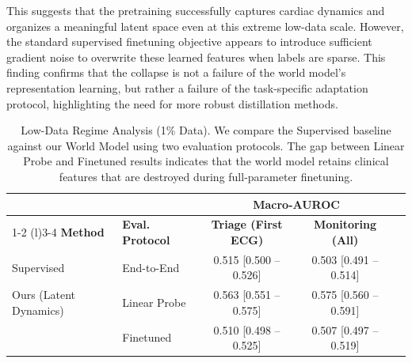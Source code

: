This suggests that the pretraining successfully captures cardiac dynamics and organizes a meaningful latent space even at this extreme low-data scale. However, the standard supervised finetuning objective appears to introduce sufficient gradient noise to overwrite these learned features when labels are sparse. This finding confirms that the collapse is not a failure of the world model's representation learning, but rather a failure of the task-specific adaptation protocol, highlighting the need for more robust distillation methods.

\begin{table}[t]
\caption{Low-Data Regime Analysis (1\% Data). We compare the Supervised baseline against our World Model using two evaluation protocols. The gap between Linear Probe and Finetuned results indicates that the world model retains clinical features that are destroyed during full-parameter finetuning.}
\label{tab:results001}
\centering
\begin{tabular}{@{}l l c cc@{}}
\toprule
\multicolumn{2}{c}{\textbf{}} & \multicolumn{2}{c}{\textbf{Macro-AUROC}} \\
\cmidrule(lr){1-2} \cmidrule(l){3-4}
\textbf{Method} & \textbf{Eval. Protocol} & \textbf{Triage (First ECG)} & \textbf{Monitoring (All)} \\
\midrule

Supervised & End-to-End & 0.515 \small{[0.500 -- 0.526]} & 0.503 \small{[0.491 -- 0.514]} \\

\addlinespace

Ours (Latent Dynamics) & Linear Probe & 0.563 \small{[0.551 -- 0.575]} & 0.575 \small{[0.560 -- 0.591]} \\
& Finetuned & 0.510 \small{[0.498 -- 0.525]} & 0.507 \small{[0.497 -- 0.519]} \\

\bottomrule
\end{tabular}
\end{table}

